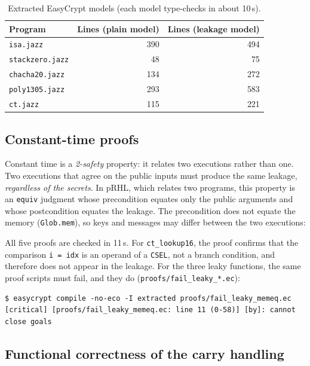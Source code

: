 \documentclass[11pt,a4paper]{article}
\newcommand{\file}[1]{\texttt{#1}}
\begin{document}
\begin{table}[h]
\centering\small
\begin{tabular}{@{}lrr@{}}
\toprule
\textbf{Program} & \textbf{Lines (plain model)} & \textbf{Lines (leakage model)} \\
\midrule
\file{isa.jazz} & 390 & 494 \\
\file{stackzero.jazz} & 48 & 75 \\
\file{chacha20.jazz} & 134 & 272 \\
\file{poly1305.jazz} & 293 & 583 \\
\file{ct.jazz} & 115 & 221 \\
\bottomrule
\end{tabular}
\caption{Extracted EasyCrypt models (each model type-checks in about 10\,s).}
\end{table}

\subsection{Constant-time proofs}

Constant time is a \emph{2-safety} property: it relates two executions
rather than one. Two executions that agree on the public inputs must
produce the same leakage, \emph{regardless of the secrets}. In pRHL, which
relates two programs, this property is an \texttt{equiv} judgment whose
precondition equates only the public arguments and whose postcondition
equates the leakage. The precondition does not equate the memory
(\texttt{Glob.mem}), so keys and messages may differ between the two
executions:



All five proofs are checked in 11\,s. For \texttt{ct\_lookup16}, the proof
confirms that the comparison \texttt{i = idx} is an operand of a
\texttt{CSEL}, not a branch condition, and therefore does not appear in the
leakage. For the three leaky functions, the same proof scripts must fail,
and they do (\file{proofs/fail\_leaky\_*.ec}):

\begin{lstlisting}[style=shell]
$ easycrypt compile -no-eco -I extracted proofs/fail_leaky_memeq.ec
[critical] [proofs/fail_leaky_memeq.ec: line 11 (0-58)] [by]: cannot close goals
\end{lstlisting}

\subsection{Functional correctness of the carry handling}
\end{document}
